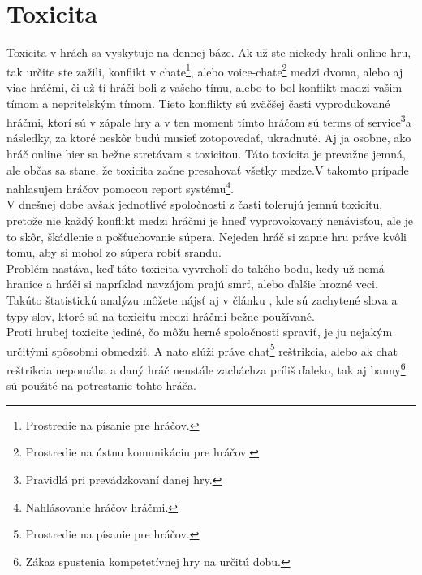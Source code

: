 \documentclass[twoside,twocolumn]{article}
\begin{document}

\section{Toxicita}

	Toxicita v hrách sa vyskytuje na dennej báze. Ak už ste niekedy hrali online hru, tak určite ste zažili, konflikt v chate\footnote{Prostredie na písanie pre hráčov.}, alebo voice-chate\footnote{Prostredie na ústnu komunikáciu pre hráčov.} medzi dvoma, alebo aj viac hráčmi, či už tí hráči boli z vašeho tímu, alebo to bol konflikt madzi vašim tímom a nepritelským tímom. Tieto konflikty sú zväčšej časti vyprodukované hráčmi, ktorí sú v zápale hry a v ten moment tímto hráčom sú terms of service\footnote{Pravidlá pri prevádzkovaní danej hry.}a následky, za ktoré neskôr budú musieť zotopovedať, ukradnuté. Aj ja osobne, ako hráč online hier sa bežne stretávam s toxicitou. Táto toxicita je prevažne jemná, ale občas sa stane, že toxicita začne presahovať všetky medze.V takomto prípade nahlasujem hráčov pomocou report systému\footnote{Nahlásovanie hráčov hráčmi.}.\\
	V dnešnej dobe avšak jednotlivé spoločnosti z časti tolerujú jemnú toxicitu, pretože nie každý konflikt medzi hráčmi je hneď vyprovokovaný nenávisťou, ale je to skôr, škádlenie a pošťuchovanie súpera. Nejeden hráč si zapne hru práve kvôli tomu, aby si mohol zo súpera robiť srandu.\\
	Problém nastáva, keď táto toxicita vyvrcholí do takého bodu, kedy už nemá hranice a hráči si napríklad navzájom prajú smrť, alebo ďalšie hrozné veci. Takúto štatistickú analýzu môžete nájsť aj v článku \cite{ghosh2021analyzing}, kde sú zachytené slova a typy slov, ktoré sú na toxicitu medzi hráčmi bežne používané.\\ 
	Proti hrubej toxicite jediné, čo môžu herné spoločnosti spraviť, je ju nejakým určitými spôsobmi obmedziť. A nato slúži práve chat\footnote{Prostredie na písanie pre hráčov.} reštrikcia, alebo ak chat reštrikcia nepomáha a daný hráč neustále zacháchza príliš ďaleko, tak aj banny\footnote{Zákaz spustenia kompetetívnej hry na určitú dobu.} sú použité na potrestanie tohto hráča.\\
\newpage





\end{document}

